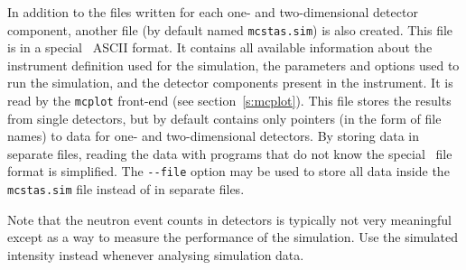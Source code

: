 In addition to the files written for each one- and two-dimensional
detector component, another file (by default named \verb+mcstas.sim+) is
also created. This file is in a special \MCS\ ASCII format. It contains
all available information about the instrument definition used for the
simulation, the parameters and options used to run the simulation, and
the detector components present in the instrument. It is read by the
\verb+mcplot+ front-end (see section~\ref{s:mcplot}). This file stores
the results from single detectors, but by default contains only pointers
(in the form of file names) to data for one- and two-dimensional
detectors. By storing data in separate files, reading the data with
programs that do not know the special \MCS\ file format is
simplified. The \verb+--file+ option may be used to store all data
inside the \verb+mcstas.sim+ file instead of in separate files.

Note that the neutron event counts in detectors is typically not very
meaningful except as a way to measure the performance of the
simulation. Use the simulated intensity instead whenever analysing
simulation data.
